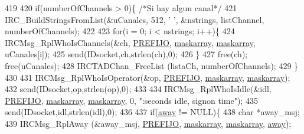 \begin{DoxyCode}
{{{{{{419 
420                                 \textcolor{keywordflow}{if}(numberOfChannels > 0)\{ \textcolor{comment}{/*Si hay algun canal*/}
421                                         IRC\_BuildStringsFromList(&uCanales, 512, \textcolor{charliteral}{' '}, &nstrings, 
      listChannel, numberOfChannels);
422 
423                                         \textcolor{keywordflow}{for}(i = 0; i < nstrings; i++)\{
424                                                 IRCMsg\_RplWhoIsChannels(&ch, 
      \hyperlink{_g-2361-06-_p1-_server_8h_a78c658ff923693099f7b621e7c351129}{PREFIJO}, \hyperlink{_g-2361-06-_p1-_server_8c_ad51a4303b7c769561b12bf04a68bc042}{maskarray}, \hyperlink{_g-2361-06-_p1-_server_8c_ad51a4303b7c769561b12bf04a68bc042}{maskarray}, uCanales[i]);
425                                                 send(IDsocket,ch,strlen(ch),0);
426                                         \}
427                                         free(ch); free(uCanales);
428                                         IRCTADChan\_FreeList (listaCh, numberOfChannels);
429                                 \}
430 
431                                 IRCMsg\_RplWhoIsOperator(&op, \hyperlink{_g-2361-06-_p1-_server_8h_a78c658ff923693099f7b621e7c351129}{PREFIJO}, 
      \hyperlink{_g-2361-06-_p1-_server_8c_ad51a4303b7c769561b12bf04a68bc042}{maskarray}, \hyperlink{_g-2361-06-_p1-_server_8c_ad51a4303b7c769561b12bf04a68bc042}{maskarray});
432                                 send(IDsocket,op,strlen(op),0);
433 
434                                 IRCMsg\_RplWhoIsIdle(&idl, \hyperlink{_g-2361-06-_p1-_server_8h_a78c658ff923693099f7b621e7c351129}{PREFIJO}, 
      \hyperlink{_g-2361-06-_p1-_server_8c_ad51a4303b7c769561b12bf04a68bc042}{maskarray}, \hyperlink{_g-2361-06-_p1-_server_8c_ad51a4303b7c769561b12bf04a68bc042}{maskarray}, 0, \textcolor{stringliteral}{":seconds idle, signon time"});
435                                 send(IDsocket,idl,strlen(idl),0);
436 
437                                 \textcolor{keywordflow}{if}(\hyperlink{_g-2361-06-_p1-_server_8c_adf86742e21384f58f8999d8317e6a370}{away} != NULL)\{
438                                         \textcolor{keywordtype}{char} *away\_msj;
439                                         IRCMsg\_RplAway (&away\_msj, \hyperlink{_g-2361-06-_p1-_server_8h_a78c658ff923693099f7b621e7c351129}{PREFIJO}, 
      \hyperlink{_g-2361-06-_p1-_server_8c_ad51a4303b7c769561b12bf04a68bc042}{maskarray}, \hyperlink{_g-2361-06-_p1-_server_8c_ad51a4303b7c769561b12bf04a68bc042}{maskarray}, \hyperlink{_g-2361-06-_p1-_server_8c_adf86742e21384f58f8999d8317e6a370}{away});
}}}}}}
\end{DoxyCode}
